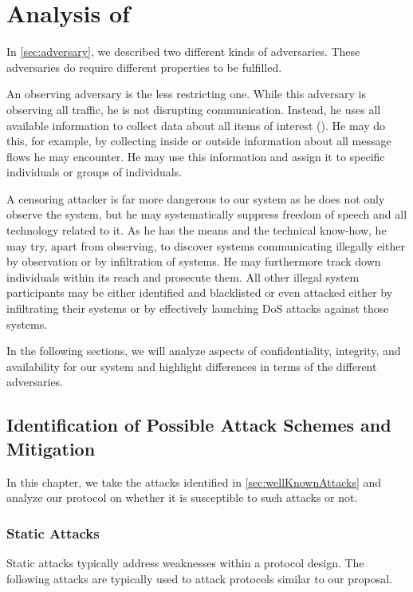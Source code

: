 \part{Analysis of \MessageVortex}\label{sec:analysis}
In \cref{sec:adversary}, we described two different kinds of adversaries. These adversaries do require different properties to be fulfilled. 

An observing adversary is the less restricting one. While this adversary is observing all traffic, he is not disrupting communication. Instead, he uses all available information to collect data about all items of interest (). He may do this, for example, by collecting inside or outside information about all message flows he may encounter. He may use this information and assign it to specific individuals or groups of individuals.

A censoring attacker is far more dangerous to our system as he does not only observe the system, but he may systematically suppress freedom of speech and all technology related to it. As he has the means and the technical know-how, he may try, apart from observing, to discover systems communicating illegally either by observation or by infiltration of systems. He may furthermore track down individuals within its reach and prosecute them. All other illegal system participants may be either identified and blacklisted or even attacked either by infiltrating their systems or by effectively launching DoS attacks against those systems.

In the following sections, we will analyze aspects of confidentiality, integrity, and availability for our system and highlight differences in terms of the different adversaries.

\chapter[Identification of Attacks and Mitigations]{Identification of Possible Attack Schemes and Mitigation}\label{sec:attacks}
In this chapter, we take the attacks identified in \cref{sec:wellKnownAttacks} and analyze our protocol on whether it is susceptible to such attacks or not.

\section{Static Attacks}
Static attacks typically address weaknesses within a protocol design. The following attacks are typically used to attack protocols similar to our proposal.

